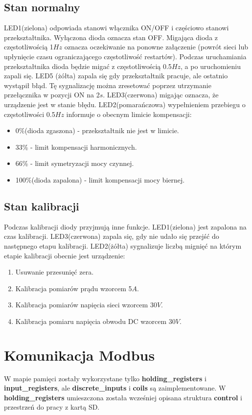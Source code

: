 \documentclass[12pt,a4paper]{article}
\begin{document}
\subsection{Stan normalny}
LED1(zielona) odpowiada stanowi włącznika ON/OFF i częściowo stanowi przekształtnika. Wyłączona dioda oznacza stan OFF. Migająca dioda z częstotliwością 1$Hz$ oznacza oczekiwanie na ponowne załączenie (powrót sieci lub upłynięcie czasu ograniczającego częstotliwość restartów). Podczas uruchamiania przekształtnika dioda będzie migać z częstotliwością 0.5$Hz$, a po uruchomieniu zapali się. LED5 (żółta) zapala się gdy przekształtnik pracuje, ale ostatnio wystąpił błąd. Tę sygnalizację można zresetować poprzez utrzymanie przełącznika w pozycji ON na 2$s$. LED3(czerwona) migając oznacza, że urządzenie jest w stanie błędu. LED2(pomarańczowa) wypełnieniem przebiegu o częstotliwości 0.5$Hz$ informuje o obecnym limicie kompensacji:
\begin{itemize}
	\item 0\%(dioda zgaszona) - przekształtnik nie jest w limicie.
	\item 33\% - limit kompensacji harmonicznych.
	\item 66\% - limit symetryzacji mocy czynnej.
	\item 100\%(dioda zapalona) - limit kompensacji mocy biernej.
\end{itemize}
\subsection{Stan kalibracji}
Podczas kalibracji diody przyjmują inne funkcje. LED1(zielona) jest zapalona na czas kalibracji. LED3(czerwona) zapala się, gdy nie udało się przejść do następnego etapu kalibracji. LED2(żółta) sygnalizuje liczbą mignięć na którym etapie kalibracji obecnie jest urządzenie:
\begin{enumerate}
	\item Usuwanie przesunięć zera.
	\item Kalibracja pomiarów prądu wzorcem 5$A$.
	\item Kalibracja pomiarów napięcia sieci wzorcem 30$V$.
	\item Kalibracja pomiaru napięcia obwodu DC wzorcem 30$V$.
\end{enumerate}

\section{Komunikacja Modbus}
W mapie pamięci zostały wykorzystane tylko \textbf{holding\_registers} i \textbf{input\_registers}, ale  \textbf{discrete\_inputs} i \textbf{coils} są zaimplementowane. W \textbf{holding\_registers} umieszczona została wcześniej opisana struktura \textbf{control} i przestrzeń do pracy z kartą SD.
\end{document}
